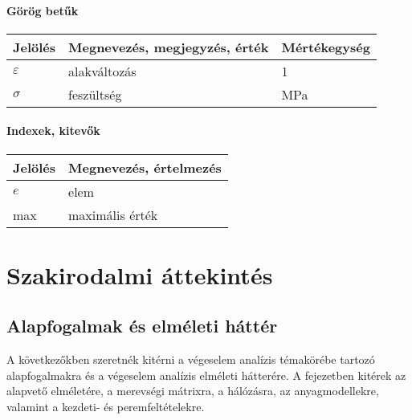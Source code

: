 \documentclass[12pt,a4paper,oneside]{report}
\begin{document}
\subsubsection*{Görög betűk}
\begin{center}
    \begin{tabular}{lp{10cm}l}
        \hline
        Jelölés & Megnevezés, megjegyzés, érték & Mértékegység \\
        \hline
                $\varepsilon$  & alakváltozás           & 1    \\
        $\sigma$  & feszültség                  & MPa             \\

        \hline
    \end{tabular}
\end{center}



\subsubsection*{Indexek, kitevők}
\begin{center}
    \begin{tabular}{lp{12.8cm}}
        \hline
        Jelölés & Megnevezés, értelmezés\\
        \hline
        $e$     & elem  \\
        max     & maximális érték        \\
        \hline
    \end{tabular}
\end{center}


\def\arraystretch{1}%

\cleardoublepage
{}
\chapter{Szakirodalmi áttekintés}

\section{Alapfogalmak és elméleti háttér}
A következőkben szeretnék kitérni a végeselem analízis témakörébe tartozó alapfogalmakra és a végeselem analízis elméleti hátterére. A fejezetben kitérek az alapvető elméletére, a merevségi mátrixra, a hálózásra, az anyagmodellekre, valamint a kezdeti- és peremfeltételekre.
\end{document}
